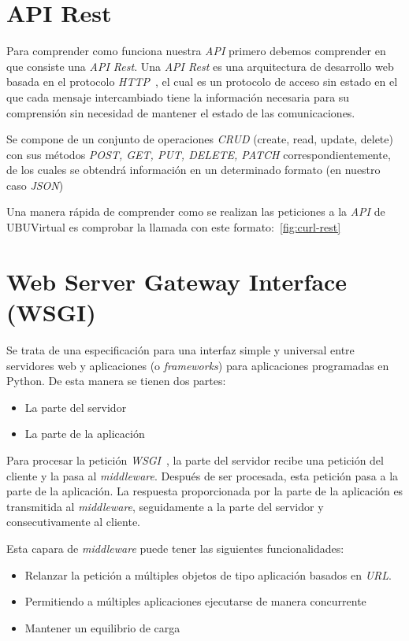 
\section{API Rest}\label{sec:api-rest}
Para comprender como funciona nuestra \textit{API} primero debemos comprender en que consiste una \textit{API Rest}. Una \textit{API Rest} es una arquitectura de desarrollo web basada en el protocolo \textit{HTTP}~\cite{wiki:http}, el cual es un protocolo de acceso sin estado en el que cada mensaje intercambiado tiene la información necesaria para su comprensión sin necesidad de mantener el estado de las comunicaciones.

Se compone de un conjunto de operaciones \textit{CRUD} (create, read, update, delete) con sus métodos \textit{POST, GET, PUT, DELETE, PATCH} correspondientemente, de los cuales se obtendrá información en un determinado formato (en nuestro caso \textit{JSON})

Una manera rápida de comprender como se realizan las peticiones a la \textit{API} de UBUVirtual es comprobar la llamada con este formato:~\ref{fig:curl-rest}
~\cite{moodle:api-rest-config}

\section{Web Server Gateway Interface (WSGI)}\label{sec:wsgi}
Se trata de una especificación para una interfaz simple y universal entre servidores web y aplicaciones (o \textit{frameworks}) para aplicaciones programadas en Python.
De esta manera se tienen dos partes:
\begin{itemize}
	\item La parte del servidor
	\item La parte de la aplicación
\end{itemize}
Para procesar la petición \textit{WSGI}~\cite{wiki:wsgi}, la parte del servidor recibe una petición del cliente y la pasa al \textit{middleware}. Después de ser procesada, esta petición pasa a la parte de la aplicación. La respuesta proporcionada por la parte de la aplicación es transmitida al \textit{middleware}, seguidamente a la parte del servidor y consecutivamente al cliente.

Esta capara de \textit{middleware} puede tener las siguientes funcionalidades:
\begin{itemize}
	\item Relanzar la petición a múltiples objetos de tipo aplicación basados en \textit{URL}.
	\item Permitiendo a múltiples aplicaciones ejecutarse de manera concurrente
	\item Mantener un equilibrio de carga
\end{itemize}

